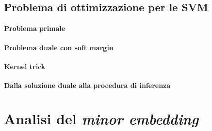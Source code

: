 \documentclass[12pt]{article}
\begin{document}
\subsection{Problema di ottimizzazione per le SVM}

\paragraph{Problema primale}

\paragraph{Problema duale con soft margin}

\paragraph{Kernel trick}

\paragraph{Dalla soluzione duale alla procedura di inferenza}

\section{Analisi del \emph{minor embedding}}
\end{document}
